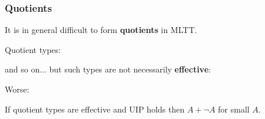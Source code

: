\documentclass[handout]{beamer} %
\begin{document}
\begin{frame}
  \frametitle{Quotients}

  It is in general difficult to form \textbf{quotients} in MLTT.
  
  \medskip
  
  Quotient types:
  and so on... but such types are not necessarily \textbf{effective}:
  \begin{mathpar}
    \small
  \end{mathpar}
  Worse:
  \begin{theorem}[Maietti 1999]
    If quotient types are effective and UIP holds then $A + \lnot A$ for small $A$.
  \end{theorem}
  
\end{frame}
\end{document}
